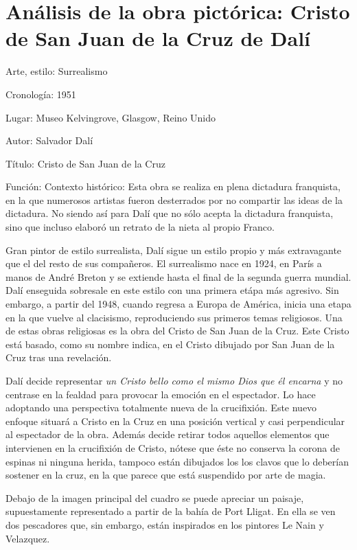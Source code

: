 \section{Análisis de la obra pictórica: Cristo de San Juan de la Cruz de Dalí}

Arte, estilo: Surrealismo

Cronología: 1951

Lugar: Museo Kelvingrove, Glasgow, Reino Unido

Autor: Salvador Dalí

Título: Cristo de San Juan de la Cruz


Función: Contexto histórico: Esta obra se realiza en plena dictadura franquista, en la que numerosos artistas fueron desterrados por no compartir las ideas de la dictadura. No siendo así para Dalí que no sólo acepta la dictadura franquista, sino que incluso elaboró un retrato de la nieta al propio Franco.

Gran pintor de estilo surrealista, Dalí sigue un estilo propio y más extravagante que el del resto de sus compañeros. El surrealismo nace en 1924, en París a manos de André Breton y se extiende hasta el final de la segunda guerra mundial. Dalí enseguida sobresale en este estilo con una primera etápa más agresivo. Sin embargo, a partir del 1948, cuando regresa a Europa de América, inicia una etapa en la que vuelve al clacisismo, reproduciendo sus primeros temas religiosos. Una de estas obras religiosas es la obra del Cristo de San Juan de la Cruz. Este Cristo está basado, como su nombre indica, en el Cristo dibujado por San Juan de la Cruz tras una revelación.

Dalí decide representar \textit{un Cristo bello como el mismo Dios que él encarna} y no centrase en la fealdad para provocar la emoción en el espectador. Lo hace adoptando una perspectiva totalmente nueva de la crucifixión. Este nuevo enfoque situará a Cristo en la Cruz en una posición vertical y casi perpendicular al espectador de la obra. Además decide retirar todos aquellos elementos que intervienen en la crucifixión de Cristo, nótese que éste no conserva la corona de espinas ni ninguna herida, tampoco están dibujados los los clavos que lo deberían sostener en la cruz, en la que parece que está suspendido por arte de magia.

Debajo de la imagen principal del cuadro se puede apreciar un paisaje, supuestamente representado a partir de la bahía de Port Lligat. En ella se ven dos pescadores que, sin embargo, están inspirados en los pintores Le Nain y Velazquez.

